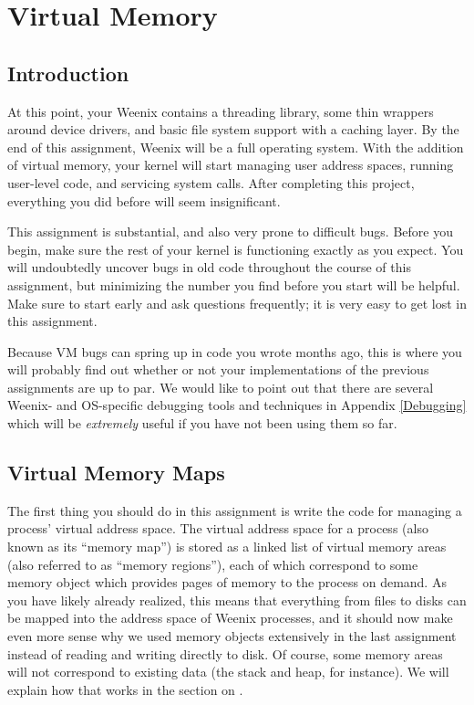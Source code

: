 \chapter{Virtual Memory}
\label{vm}

\section{Introduction}

At this point, your Weenix contains a threading library, some thin wrappers around device drivers, and basic file system support with a caching layer. By the end of this assignment, Weenix will be a full operating system. With the addition of virtual memory, your kernel will start managing user address spaces, running user-level code, and servicing system calls. After completing this project, everything you did before will seem insignificant.

This assignment is substantial, and also very prone to difficult bugs. Before you begin, make sure the rest of your kernel is functioning exactly as you expect. You will undoubtedly uncover bugs in old code throughout the course of this assignment, but minimizing the number you find before you start will be helpful. Make sure to start early and ask questions frequently; it is very easy to get lost in this assignment.


Because VM bugs can spring up in code you wrote months ago, this is where you will probably find out whether or not your implementations of the previous assignments are up to par. We would like to point out that there are several Weenix- and OS-specific debugging tools and techniques in Appendix \ref{Debugging} which will be \textit{extremely} useful if you have not been using them so far.

\section{Virtual Memory Maps}

The first thing you should do in this assignment is write the code for managing a process' virtual address space. The virtual address space for a process (also known as its ``memory map'') is stored as a linked list of virtual memory areas (also referred to as ``memory regions''), each of which correspond to some memory object which provides pages of memory to the process on demand. As you have likely already realized, this means that everything from files to disks can be mapped into the address space of Weenix processes, and it should now make even more sense why we used memory objects extensively in the last assignment instead of reading and writing directly to disk. Of course, some memory areas will not correspond to existing data (the stack and heap, for instance). We will explain how that works in the section on .

